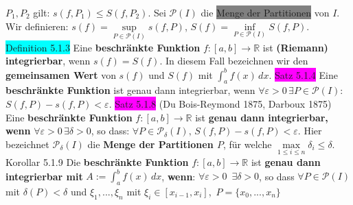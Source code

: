 \documentclass[landscape, 10pt]{article}
\newcommand{\R}{\mathbb{R}}
\begin{document}
\begin{multicols}{3}
                \textcolor{NavyBlue}{$P_1,P_2$}
                 gilt: \textcolor{NavyBlue}{$s(f,P_1)\leqslant S(f,P_2)$}.
Sei \textcolor{NavyBlue}{$\mathcal{P}(I)$} die \colorbox{gray}{Menge der Partitionen} 
                von \textcolor{NavyBlue}{$I$}. Wir definieren: 
                \textcolor{NavyBlue}{$s(f)=\sup\limits_{P\in\mathcal{P}(I)}s(f,P)$},\quad 
                \textcolor{NavyBlue}{$S(f)=\inf\limits_{P\in\mathcal{P}(I)}S(f,P)$}. 
\colorbox{cyan}{Definition 5.1.3} Eine \textbf{beschränkte Funktion} 
                \textcolor{NavyBlue}{$f:[a,b]\longrightarrow\R$} 
                ist \textbf{(Riemann) integrierbar}, wenn \textcolor{NavyBlue}{$s(f)=S(f)$}. 
         In diesem Fall 
                bezeichnen wir den \textbf{gemeinsamen Wert} 
                von \textcolor{NavyBlue}{$s(f)$} und 
                \textcolor{NavyBlue}{$S(f)$} mit 
                \textcolor{NavyBlue}{$\int_a^bf(x)\,dx$}.
\colorbox{magenta}{Satz 5.1.4} Eine \textbf{beschränkte Funktion} ist 
                genau dann integrierbar, wenn 
                \textcolor{NavyBlue}{$\forall\varepsilon>0\,\exists P\in\mathcal{P}(I)$}:
                \textcolor{NavyBlue}{$S(f,P)-s(f,P)<\varepsilon$}.
\colorbox{magenta}{Satz 5.1.8} (Du Bois-Reymond 1875, Darboux 1875) 
                Eine \textbf{beschränkte Funktion} 
                \textcolor{NavyBlue}{$f:[a,b]\longrightarrow\R$} 
                ist \textbf{genau dann 
         integrierbar, wenn} 
                \textcolor{NavyBlue}{$\forall\varepsilon>0\,\exists\delta>0$}, so dass: 
                \textcolor{NavyBlue}{
                $\forall P\in\mathcal{P}_\delta(I),\,S(f,P)-s(f,P)<\varepsilon$}.
         Hier bezeichnet \textcolor{NavyBlue}{$\mathcal{P}_\delta(I)$} die 
                \textbf{Menge der Partitionen $P$}, für welche 
                \textcolor{NavyBlue}{
                $\max\limits_{1\leqslant i\leqslant n}\delta_i\leqslant\delta$}. 
\colorbox{BurntOrange}{Korollar 5.1.9} Die \textbf{beschränkte Funktion} 
                \textcolor{NavyBlue}{$f:[a,b]\longrightarrow\R$} ist 
                \textbf{genau dann integrierbar mit}
                \textcolor{NavyBlue}{$A:=\int_a^bf(x)\,dx$}, 
         \textbf{wenn}: 
                \textcolor{NavyBlue}{$\forall\varepsilon>0\enspace\exists\delta>0$}, so dass 
                \textcolor{NavyBlue}{$\forall P\in\mathcal{P}(I)$} mit 
                \textcolor{NavyBlue}{$\delta(P)<\delta$}
                und \textcolor{NavyBlue}{$\xi_1,...,\xi_n$} mit 
                \textcolor{NavyBlue}{$\xi_i\in[x_{i-1},x_i]$},\,
         \textcolor{NavyBlue}{$P=\{x_0,...,x_n\}$} 

\end{multicols}
\end{document}
